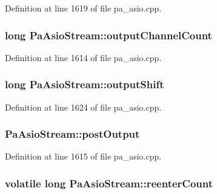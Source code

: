 Definition at line 1619 of file pa\+\_\+asio.\+cpp.

\subsubsection[{\texorpdfstring{output\+Channel\+Count}{outputChannelCount}}]{\setlength{\rightskip}{0pt plus 5cm}long Pa\+Asio\+Stream\+::output\+Channel\+Count}\hypertarget{struct_pa_asio_stream_a8d05870e5bf5bbace1bd680f3b300e8e}{}\label{struct_pa_asio_stream_a8d05870e5bf5bbace1bd680f3b300e8e}


Definition at line 1614 of file pa\+\_\+asio.\+cpp.

\subsubsection[{\texorpdfstring{output\+Shift}{outputShift}}]{\setlength{\rightskip}{0pt plus 5cm}long Pa\+Asio\+Stream\+::output\+Shift}\hypertarget{struct_pa_asio_stream_a996681ee962b66ef8c5b316f529fe6a6}{}\label{struct_pa_asio_stream_a996681ee962b66ef8c5b316f529fe6a6}


Definition at line 1624 of file pa\+\_\+asio.\+cpp.

\subsubsection[{\texorpdfstring{post\+Output}{postOutput}}]{ Pa\+Asio\+Stream\+::post\+Output}\hypertarget{struct_pa_asio_stream_af03bbc90652180dfed1499eae58f076d}{}\label{struct_pa_asio_stream_af03bbc90652180dfed1499eae58f076d}


Definition at line 1615 of file pa\+\_\+asio.\+cpp.

\subsubsection[{\texorpdfstring{reenter\+Count}{reenterCount}}]{\setlength{\rightskip}{0pt plus 5cm}volatile long Pa\+Asio\+Stream\+::reenter\+Count}\hypertarget{struct_pa_asio_stream_aa57477dfd1c26729a2d518e57e78c885}{}\label{struct_pa_asio_stream_aa57477dfd1c26729a2d518e57e78c885}


